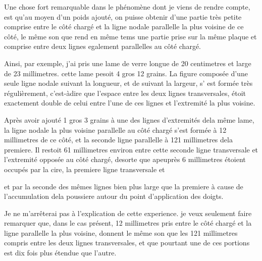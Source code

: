 \documentclass[11pt,a4paper]{article}
\begin{document}

Une chose fort remarquable dans le phénomène dont je viens
de rendre compte, est qu'au moyen d'un poids ajouté, on
puisse obtenir d'une partie très petite comprise entre le côté
chargé et la ligne nodale parallelle la plus voisine de ce
côté, le même son que rend en même tems une partie 
prise sur la même plaque et comprise entre deux
lignes egalement parallelles au côté chargé.

Ainsi, par exemple, j'ai pris une lame de verre
longue de 20 centimetres et large de 23 millimetres.
cette lame pesoit 4 gros 12 grains. La figure  composée
d'une seule ligne nodale suivant la longueur, et de
 suivant la largeur, s' est formée très régulièrement, 
 c'est-àdire que l'espace entre les deux
lignes transversales, étoit exactement double de celui entre
l'une de ces lignes et l'extremité la plus voisine.

Après avoir ajouté 1 gros 3 grains à une des lignes d'extremités
dela même lame, la ligne nodale la plus voisine parallelle
au côté chargé s'est formée à 12 millimetres de ce côté,
et la seconde ligne parallelle à 121 millimetres dela
premiere. Il restoit 61 millimetres environ entre cette
seconde ligne transversale et l'extremité opposée au
côté chargé, desorte que  apeuprès 6 millimetres
étoient occupés par la cire, la premiere ligne transversale et


et par la seconde des mêmes lignes bien plus large que
la premiere à cause de l'accumulation dela poussiere autour
du point d'application des doigts.

Je ne m'arrêterai pas à l'explication de cette experience.
je veux seulement faire remarquer que, dans le cas
présent,  12 millimetres pris entre le côté
chargé et la ligne parallelle la plus voisine, donnent
le même son que les 121 millimetres compris entre
les deux lignes transversales, et que pourtant une
de ces portions est dix fois plus  étendue que
l'autre.
\end{document}

